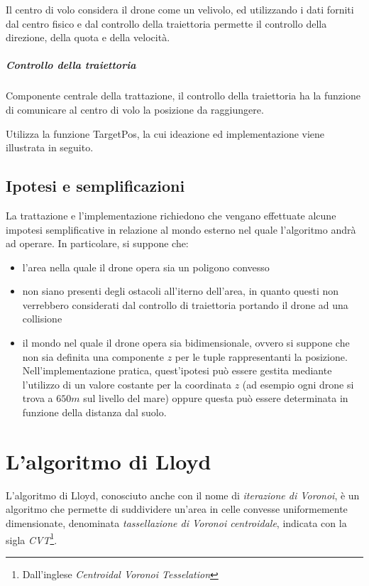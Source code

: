 \documentclass[11pt,a4paper]{report}
\newcommand{\name}[1]{{\ttfamily #1}}
\begin{document}
Il centro di volo considera il drone come un velivolo, ed utilizzando i dati forniti dal centro fisico e dal controllo della traiettoria permette il controllo della direzione, della quota e della velocità.

\paragraph{Controllo della traiettoria}

Componente centrale della trattazione, il controllo della traiettoria ha la funzione di comunicare al centro di volo la posizione da raggiungere.

Utilizza la funzione \name{TargetPos}, la cui ideazione ed implementazione viene illustrata in seguito.

\section{Ipotesi e semplificazioni}


La trattazione e l'implementazione richiedono che vengano effettuate alcune impotesi semplificative in relazione al mondo esterno nel quale l'algoritmo andrà ad operare. In particolare, si suppone che:

\begin{itemize}
	\item l'area nella quale il drone opera sia un poligono convesso
	\item non siano presenti degli ostacoli all'iterno dell'area, in quanto questi non verrebbero considerati dal controllo di traiettoria portando il drone ad una collisione
	\item il mondo nel quale il drone opera sia bidimensionale, ovvero si suppone che non sia definita una componente $z$ per le tuple rappresentanti la posizione. Nell'implementazione pratica, quest'ipotesi può essere gestita mediante l'utilizzo di un valore costante per la coordinata $z$ (ad esempio ogni drone si trova a $650 m$ sul livello del mare) oppure questa può essere determinata in funzione della distanza dal suolo.
\end{itemize}

\pagebreak

\chapter{L'algoritmo di Lloyd}

L'algoritmo di Lloyd, conosciuto anche con il nome di \textit{iterazione di Voronoi}, è un algoritmo che permette di suddividere un'area in celle convesse uniformemente dimensionate, denominata \textit{tassellazione di Voronoi centroidale}, indicata con la sigla \textit{CVT}\footnote{Dall'inglese \textit{Centroidal Voronoi Tesselation}}.
\end{document}
